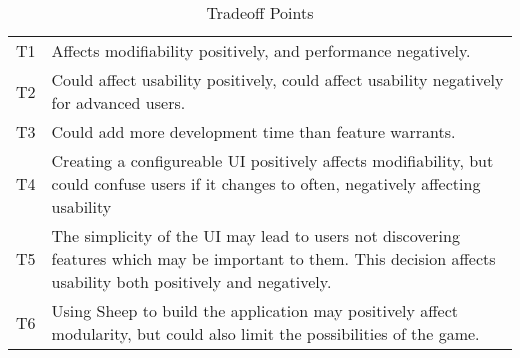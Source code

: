 \begin{table}[H]
	\begin{center}
		\begin{tabular}{| c | p{14cm} | }
    	\hline
		T1	& Affects modifiability positively, and performance negatively.\\
		T2	& Could affect usability positively, could affect usability negatively   
		      for advanced users.\\	
		T3	& Could add more development time than feature warrants.\\
		T4	& Creating a configureable UI positively affects modifiability,
		      but could confuse users if it changes to often, negatively
		      affecting usability\\					
		T5	& The simplicity of the UI may lead to users not discovering
		      features which may be important to them. This decision
		      affects usability both positively and negatively.\\
		T6	& Using Sheep to build the application may positively affect
		      modularity, but could also limit the possibilities of the
		      game.\\
        \hline
    	\end{tabular}
	\end{center}
	\label{tab:tradeoffPoints}
	\caption{Tradeoff Points}
\end{table}
